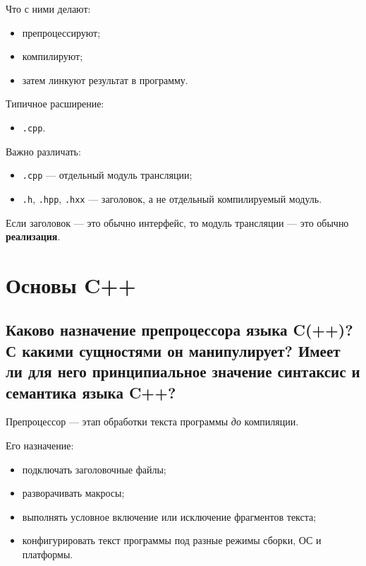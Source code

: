 Что с ними делают:
\begin{itemize}
    \item препроцессируют;
    \item компилируют;
    \item затем линкуют результат в программу.
\end{itemize}

Типичное расширение:
\begin{itemize}
    \item \texttt{.cpp}.
\end{itemize}

Важно различать:
\begin{itemize}
    \item \texttt{.cpp} --- отдельный модуль трансляции;
    \item \texttt{.h}, \texttt{.hpp}, \texttt{.hxx} --- заголовок, а не отдельный компилируемый модуль.
\end{itemize}

\begin{remark}
Если заголовок --- это обычно интерфейс, то модуль трансляции --- это обычно \textbf{реализация}.
\end{remark}



\section{Основы C++}

\subsection{Каково назначение препроцессора языка C(++)? С какими сущностями он манипулирует? Имеет ли для него принципиальное значение синтаксис и семантика языка C++?}

\begin{definition}[Препроцессор]
Препроцессор --- этап обработки текста программы \emph{до} компиляции.
\end{definition}

Его назначение:
\begin{itemize}
    \item подключать заголовочные файлы;
    \item разворачивать макросы;
    \item выполнять условное включение или исключение фрагментов текста;
    \item конфигурировать текст программы под разные режимы сборки, ОС и платформы.
\end{itemize}


